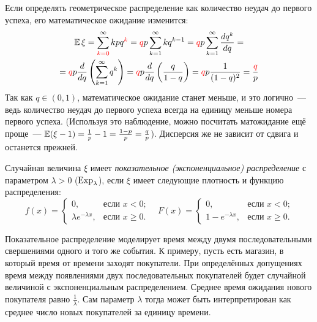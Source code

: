 \begin{rmrk}
    Если определять геометрическое распределение как количество неудач до первого успеха, его математическое ожидание изменится:
    \begin{multline*}
        \operatorname{\mathbb{E}} \xi=\sum\limits^{\infty}_{\color{red}k=0} k p q^{\color{red}k}= {\color{red}q}p \sum\limits_{k=1}^{\infty} k q^{k-1}= {\color{red}q}p \sum\limits_{k=1}^{\infty} \frac{d q^{k}}{d q} = \\
        = {\color{red}q}p \frac{d}{d q}\left(\sum\limits_{k=1}^{\infty} q^{k}\right)={\color{red}q} p \frac{d}{d q}\left(\frac{q}{1-q}\right)= {\color{red}q}p \frac{1}{(1-q)^{2}}=\frac{{\color{red}q}}{p}
    \end{multline*}
    Так как $q \in (0,1)$, математическое ожидание станет меньше, и это логично~--- ведь количество неудач до первого успеха всегда на единицу меньше номера первого успеха. 
    (Используя это наблюдение, можно посчитать матожидание ещё проще~--- $\operatorname{\mathbb{E}} (\xi - 1) = \frac{1}{p} - 1 = \frac{1-p}{p} = \frac{q}{p}$). 
    Дисперсия же не зависит от сдвига и останется прежней.
\end{rmrk}

\begin{defn}
    Случайная величина $\xi$ имеет \textit{показательное (экспоненциальное) распределение} с параметром $\lambda > 0$ ($\operatorname{\mathrm{Exp}}_{\lambda}$), 
    если $\xi$ имеет следующие плотность и функцию распределения:
    \begin{equation*}
        f(x) = 
        \begin{cases}
            0, & \text{если $x < 0$;} \\
            \lambda e^{-\lambda x}, & \text{если $x \geqslant 0$.}
        \end{cases}
        \quad 
        F(x) = 
        \begin{cases}
            0, & \text{если $x < 0$;} \\
            1 - e^{-\lambda x}, & \text{если $x \geqslant 0$.}
        \end{cases}
    \end{equation*}
\end{defn}

\begin{rmrk}
    Показательное распределение моделирует время между двумя последовательными свершениями одного и того же события. 
    К примеру, пусть есть магазин, в который время от времени заходят покупатели. 
    При определённых допущениях время между появлениями двух последовательных покупателей будет случайной величиной с экспоненциальным распределением. 
    Среднее время ожидания нового покупателя равно $\frac{1}{\lambda}$. 
    Сам параметр $\lambda$ тогда может быть интерпретирован как среднее число новых покупателей за единицу времени. 
\end{rmrk}

